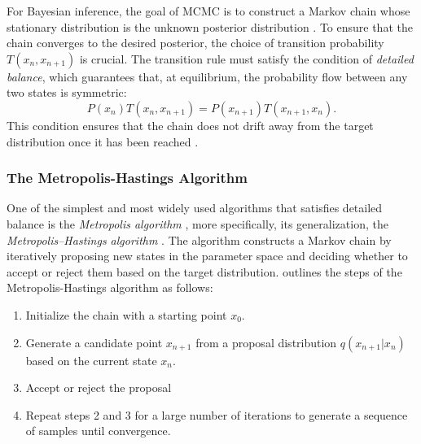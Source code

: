 \documentclass[preprint,longauthor]{aastex631}
\numberwithin{equation}{section}
\begin{document}
For Bayesian inference, the goal of MCMC is to construct a Markov chain whose stationary distribution is the unknown posterior distribution \citep{brewer1BayesianInference2018}. To ensure that the chain converges to the desired posterior, the choice of transition probability $T(x_n, x_{n+1})$ is crucial. The transition rule must satisfy the condition of \textit{detailed balance}, which guarantees that, at equilibrium, the probability flow between any two states is symmetric:
\begin{equation}
  P(x_n)T(x_n, x_{n+1}) = P(x_{n+1})T(x_{n+1}, x_n).
\end{equation}
This condition ensures that the chain does not drift away from the target distribution once it has been reached \citep{vontoussaintBayesianInferencePhysics2011}.

\subsubsection{The Metropolis-Hastings Algorithm}

One of the simplest and most widely used algorithms that satisfies detailed balance is the \textit{Metropolis algorithm} \citep{metropolisEquationStateCalculations1953}, more specifically, its generalization, the \textit{Metropolis–Hastings algorithm} \citep{hastingsMonteCarloSampling1970}. The algorithm constructs a Markov chain by iteratively proposing new states in the parameter space and deciding whether to accept or reject them based on the target distribution. \citet{brewer1BayesianInference2018} outlines the steps of the Metropolis-Hastings algorithm as follows:

\begin{enumerate}
  \item Initialize the chain with a starting point $x_0$.
  \item Generate a candidate point $x_{n+1}$ from a proposal distribution $q(x_{n+1}|x_n)$ based on the current state $x_n$.
  \item Accept or reject the proposal
  \item Repeat steps 2 and 3 for a large number of iterations to generate a sequence of samples until convergence.
\end{enumerate}
\end{document}
